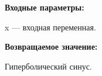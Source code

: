 \textbf{Входные параметры:}

 x --- входная переменная.

\textbf{Возвращаемое значение:}

Гиперболический синус.